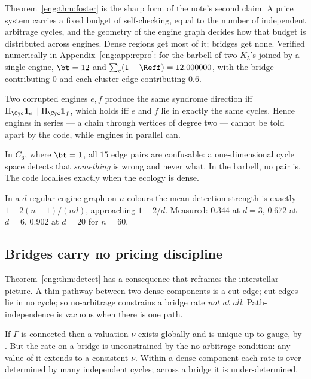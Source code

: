 Theorem~\ref{eng:thm:foster} is the sharp form of the note's second claim. A
price system carries a fixed budget of self-checking, equal to the number
of independent arbitrage cycles, and the geometry of the engine graph
decides how that budget is distributed across engines. Dense regions get
most of it; bridges get none. Verified numerically in
Appendix~\ref{eng:app:repro}: for the barbell of two $K_5$'s joined by a single
engine, $\bt = 12$ and $\sum_e(1-\Reff) = 12.000000$, with the bridge
contributing $0$ and each cluster edge contributing $0.6$.

\begin{proposition}\label{eng:prop:series}
Two corrupted engines $e, f$ produce the same syndrome direction iff
$\Pi_{\Cyc}\mathbf{1}_e \parallel \Pi_{\Cyc}\mathbf{1}_f$, which holds iff
$e$ and $f$ lie in exactly the same cycles. Hence engines in series --- a
chain through vertices of degree two --- cannot be told apart by the code,
while engines in parallel can.
\end{proposition}

In $C_6$, where $\bt = 1$, all $15$ edge pairs are confusable: a
one-dimensional cycle space detects that \emph{something} is wrong and
never what. In the barbell, no pair is. The code localises exactly when the
ecology is dense.

\begin{corollary}\label{eng:cor:density}
In a $d$-regular engine graph on $n$ colours the mean detection strength is
exactly $1 - 2(n-1)/(nd)$, approaching $1 - 2/d$. Measured: $0.344$ at
$d=3$, $0.672$ at $d=6$, $0.902$ at $d=20$ for $n=60$.
\end{corollary}

\subsection{Bridges carry no pricing discipline}\label{eng:S6.3}
\label{eng:sec:bridge}

Theorem~\ref{eng:thm:detect} has a consequence that reframes the interstellar
picture. A thin pathway between two dense components is a cut edge; cut
edges lie in no cycle; so no-arbitrage constrains a bridge rate \emph{not
at all}. Path-independence is vacuous when there is one path.

\begin{corollary}\label{eng:numeraire-global-but-uninformative}
If $\Gamma$ is connected then a valuation $\nu$ exists globally and is
unique up to gauge, by \cite[Thm.~3.3]{vtok}. But the rate on a bridge is
unconstrained by the no-arbitrage condition: any value of it extends to a
consistent $\nu$. Within a dense component each rate is over-determined by
many independent cycles; across a bridge it is under-determined.
\end{corollary}

